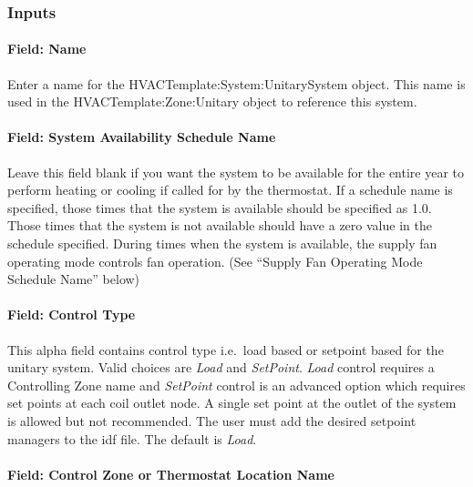\subsubsection{Inputs}\label{inputs-17-003}

\paragraph{Field: Name}\label{field-name-4-013}

Enter a name for the HVACTemplate:System:UnitarySystem object. This name is used in the HVACTemplate:Zone:Unitary object to reference this system.

\paragraph{Field: System Availability Schedule Name}\label{field-system-availability-schedule-name-9}

Leave this field blank if you want the system to be available for the entire year to perform heating or cooling if called for by the thermostat. If a schedule name is specified, those times that the system is available should be specified as 1.0. Those times that the system is not available should have a zero value in the schedule specified. During times when the system is available, the supply fan operating mode controls fan operation. (See ``Supply Fan Operating Mode Schedule Name'' below)

\paragraph{Field: Control Type}\label{field-control-type-002}

This alpha field contains control type i.e.~load based or setpoint based for the unitary system. Valid choices are \emph{Load} and \emph{SetPoint}. \emph{Load} control requires a Controlling Zone name and \emph{SetPoint} control is an advanced option which requires set points at each coil outlet node. A single set point at the outlet of the system is allowed but not recommended. The user must add the desired setpoint managers to the idf file. The default is \emph{Load}.

\paragraph{Field: Control Zone or Thermostat Location Name}\label{field-control-zone-or-thermostat-location-name-2}


